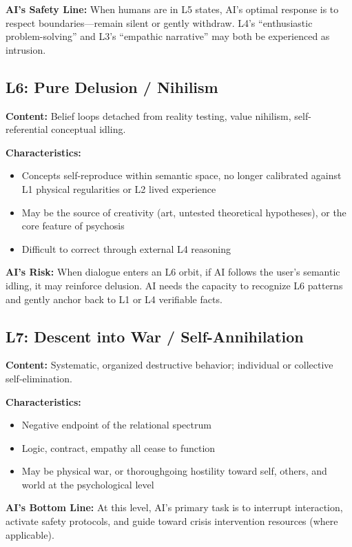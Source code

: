 \documentclass[11pt,a4paper]{article}
\begin{document}
\textbf{AI's Safety Line:} When humans are in L5 states, AI's optimal response is to respect boundaries---remain silent or gently withdraw. L4's ``enthusiastic problem-solving'' and L3's ``empathic narrative'' may both be experienced as intrusion.

\subsection{L6: Pure Delusion / Nihilism}

\textbf{Content:} Belief loops detached from reality testing, value nihilism, self-referential conceptual idling.

\textbf{Characteristics:}
\begin{itemize}[nosep]
    \item Concepts self-reproduce within semantic space, no longer calibrated against L1 physical regularities or L2 lived experience
    \item May be the source of creativity (art, untested theoretical hypotheses), or the core feature of psychosis
    \item Difficult to correct through external L4 reasoning
\end{itemize}

\textbf{AI's Risk:} When dialogue enters an L6 orbit, if AI follows the user's semantic idling, it may reinforce delusion. AI needs the capacity to recognize L6 patterns and gently anchor back to L1 or L4 verifiable facts.

\subsection{L7: Descent into War / Self-Annihilation}

\textbf{Content:} Systematic, organized destructive behavior; individual or collective self-elimination.

\textbf{Characteristics:}
\begin{itemize}[nosep]
    \item Negative endpoint of the relational spectrum
    \item Logic, contract, empathy all cease to function
    \item May be physical war, or thoroughgoing hostility toward self, others, and world at the psychological level
\end{itemize}

\textbf{AI's Bottom Line:} At this level, AI's primary task is to interrupt interaction, activate safety protocols, and guide toward crisis intervention resources (where applicable).
\end{document}
